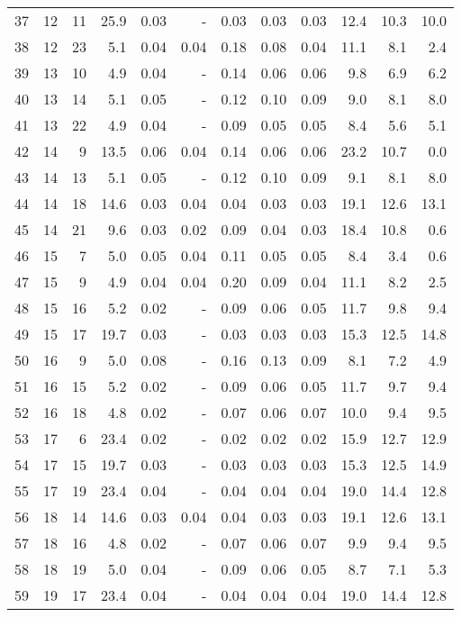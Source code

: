 \begin{small}
\begin{longtable}[c]{lrrrrr|rrr|rrr}
37 & 12 & 11 & 25.9 & 0.03 & - & 0.03 & 0.03 & 0.03 & 12.4 & 10.3 & 10.0 \\
38 & 12 & 23 & 5.1 & 0.04 & 0.04 & 0.18 & 0.08 & 0.04 & 11.1 & 8.1 & 2.4 \\
39 & 13 & 10 & 4.9 & 0.04 & - & 0.14 & 0.06 & 0.06 & 9.8 & 6.9 & 6.2 \\
40 & 13 & 14 & 5.1 & 0.05 & - & 0.12 & 0.10 & 0.09 & 9.0 & 8.1 & 8.0 \\
41 & 13 & 22 & 4.9 & 0.04 & - & 0.09 & 0.05 & 0.05 & 8.4 & 5.6 & 5.1 \\
42 & 14 & 9 & 13.5 & 0.06 & 0.04 & 0.14 & 0.06 & 0.06 & 23.2 & 10.7 & 0.0 \\
43 & 14 & 13 & 5.1 & 0.05 & - & 0.12 & 0.10 & 0.09 & 9.1 & 8.1 & 8.0 \\
44 & 14 & 18 & 14.6 & 0.03 & 0.04 & 0.04 & 0.03 & 0.03 & 19.1 & 12.6 & 13.1 \\
45 & 14 & 21 & 9.6 & 0.03 & 0.02 & 0.09 & 0.04 & 0.03 & 18.4 & 10.8 & 0.6 \\
46 & 15 & 7 & 5.0 & 0.05 & 0.04 & 0.11 & 0.05 & 0.05 & 8.4 & 3.4 & 0.6 \\
47 & 15 & 9 & 4.9 & 0.04 & 0.04 & 0.20 & 0.09 & 0.04 & 11.1 & 8.2 & 2.5 \\
48 & 15 & 16 & 5.2 & 0.02 & - & 0.09 & 0.06 & 0.05 & 11.7 & 9.8 & 9.4 \\
49 & 15 & 17 & 19.7 & 0.03 & - & 0.03 & 0.03 & 0.03 & 15.3 & 12.5 & 14.8 \\
50 & 16 & 9 & 5.0 & 0.08 & - & 0.16 & 0.13 & 0.09 & 8.1 & 7.2 & 4.9 \\
51 & 16 & 15 & 5.2 & 0.02 & - & 0.09 & 0.06 & 0.05 & 11.7 & 9.7 & 9.4 \\
52 & 16 & 18 & 4.8 & 0.02 & - & 0.07 & 0.06 & 0.07 & 10.0 & 9.4 & 9.5 \\
53 & 17 & 6 & 23.4 & 0.02 & - & 0.02 & 0.02 & 0.02 & 15.9 & 12.7 & 12.9 \\
54 & 17 & 15 & 19.7 & 0.03 & - & 0.03 & 0.03 & 0.03 & 15.3 & 12.5 & 14.9 \\
55 & 17 & 19 & 23.4 & 0.04 & - & 0.04 & 0.04 & 0.04 & 19.0 & 14.4 & 12.8 \\
56 & 18 & 14 & 14.6 & 0.03 & 0.04 & 0.04 & 0.03 & 0.03 & 19.1 & 12.6 & 13.1 \\
57 & 18 & 16 & 4.8 & 0.02 & - & 0.07 & 0.06 & 0.07 & 9.9 & 9.4 & 9.5 \\
58 & 18 & 19 & 5.0 & 0.04 & - & 0.09 & 0.06 & 0.05 & 8.7 & 7.1 & 5.3 \\
59 & 19 & 17 & 23.4 & 0.04 & - & 0.04 & 0.04 & 0.04 & 19.0 & 14.4 & 12.8 \\

\end{longtable}
\end{small}
